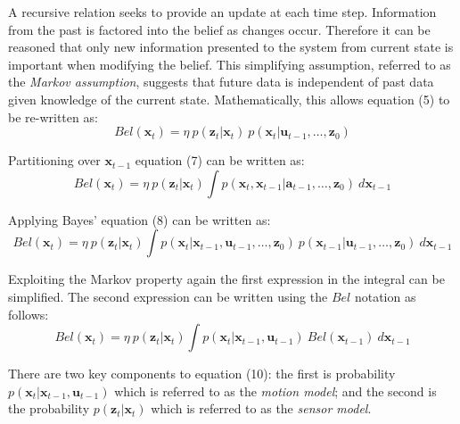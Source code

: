 \documentclass[a4paper]{article}
\begin{document}
A recursive relation seeks to provide an update at each time step. Information from the past is factored into the belief as changes occur. Therefore it can be reasoned that only new information presented to the system from current state is important when modifying the belief. This simplifying assumption, referred to as the \textit{Markov assumption}, suggests that future data is independent of past data given knowledge of the current state. Mathematically, this allows equation (5) to be re-written as:
\begin{equation}
Bel(\mathbf{x}_t) = \eta \ p(\mathbf{z}_t | \mathbf{x}_t) \ p(\mathbf{x}_t | \mathbf{u}_{t-1},\ldots,\mathbf{z}_0)
\end{equation} 

Partitioning over $\mathbf{x}_{t-1}$ equation (7) can be written as:
\begin{equation}
Bel(\mathbf{x}_t) = \eta \ p(\mathbf{z}_t | \mathbf{x}_t) \int p(\mathbf{x}_t, \mathbf{x}_{t-1} | \mathbf{a}_{t-1},\ldots,\mathbf{z}_0) \ d\mathbf{x}_{t-1}
\end{equation}

Applying Bayes' equation (8) can be written as:
\begin{equation}
Bel(\mathbf{x}_t) = \eta \ p(\mathbf{z}_t | \mathbf{x}_t) \int p(\mathbf{x}_{t} | \mathbf{x}_{t-1},\mathbf{u}_{t-1},\ldots,\mathbf{z}_0) \ p(\mathbf{x}_{t-1} | \mathbf{u}_{t-1},\ldots,\mathbf{z}_0) \ d\mathbf{x}_{t-1}
\end{equation}

Exploiting the Markov property again the first expression in the integral can be simplified. The second expression can be written using the $Bel$ notation as follows:
\begin{equation}
Bel(\mathbf{x}_t) = \eta \ p(\mathbf{z}_t | \mathbf{x}_t) \int p(\mathbf{x}_{t} | \mathbf{x}_{t-1},\mathbf{u}_{t-1}) \ Bel(\mathbf{x}_{t-1}) \ d\mathbf{x}_{t-1}
\end{equation}

There are two key components to equation (10):  the first is probability $p(\mathbf{x}_t| \mathbf{x}_{t-1}, \mathbf{u}_{t-1})$ which is referred to as the \textit{motion model}; and the second is the probability $p(\mathbf{z}_t|\mathbf{x}_t)$ which is referred to as the \textit{sensor model}.
\end{document}
